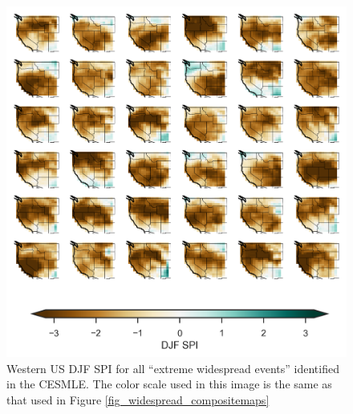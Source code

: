 \documentclass[final, double]{ua-thesis}
\begin{document}
\begin{figure}[ht]
\centering
\centerline{\includegraphics[width=39pc]{p3figures/fig_cesm_allevents.png}}
\caption{Western US DJF SPI for all ``extreme widespread events'' identified in the CESMLE. The color scale used in this image is the same as that used in Figure \ref{fig_widespread_compositemaps}}
\label{sfig_cesm_allevents}
\end{figure}




\end{document}

